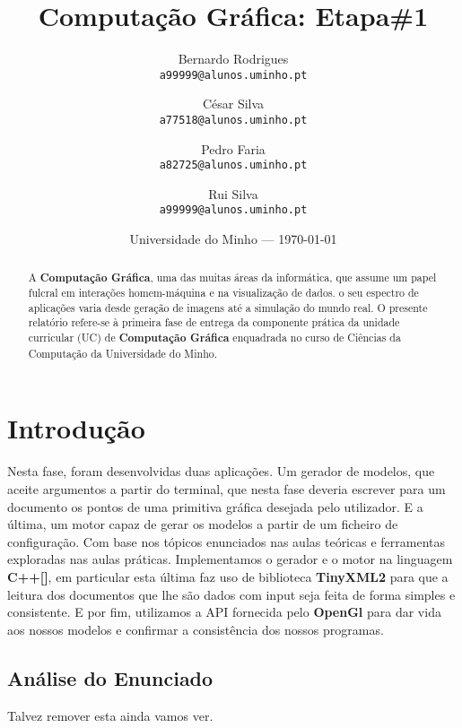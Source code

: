\documentclass{article}
\title{Computação Gráfica: Etapa\#1} %
\author{Bernardo Rodrigues\\ \texttt{a99999@alunos.uminho.pt}\\ \and César Silva\\ \texttt{a77518@alunos.uminho.pt}\\ \and Pedro Faria\\ \texttt{a82725@alunos.uminho.pt} \and Rui Silva\\ \texttt{a99999@alunos.uminho.pt}\\} %
\date{Universidade do Minho --- \today} %
\begin{document}
\maketitle 
\newpage

\begin{abstract}
A \textbf{Computação Gráfica}, uma das muitas áreas da informática, que assume um papel fulcral em interações homem-máquina e na visualização de dados. o seu espectro de aplicações varia desde geração de imagens até a simulação do mundo real.
O presente relatório refere-se à primeira fase de entrega da componente prática da unidade curricular (UC) de \textbf{Computação Gráfica} enquadrada no curso de Ciências da Computação da Universidade do Minho.
\end{abstract}
\newpage


\tableofcontents{}
\newpage


\section{Introdução}

Nesta fase, foram desenvolvidas duas aplicações. Um gerador de modelos, que aceite argumentos a partir do terminal, que nesta fase deveria escrever para um documento os pontos de uma primitiva gráfica desejada pelo utilizador. E a última, um motor capaz de gerar os modelos a partir de um ficheiro de configuração. 
Com base nos tópicos enunciados nas aulas teóricas e ferramentas exploradas nas aulas práticas. Implementamos o gerador e o motor na linguagem \textbf{C++[]}, em particular esta última faz uso de biblioteca \textbf{TinyXML2} para que a leitura dos documentos que lhe são dados com input seja feita de forma simples e consistente. E por fim,  utilizamos a API fornecida pelo \textbf{OpenGl} para dar vida aos nossos modelos e confirmar a consistência dos nossos programas.

\subsection{Análise do Enunciado}

Talvez remover esta ainda vamos ver.
\end{document}
